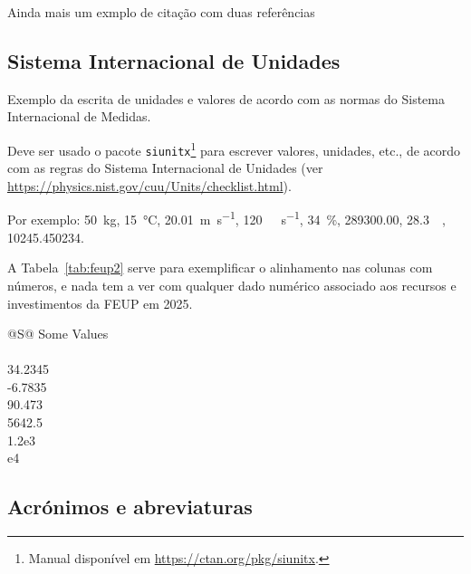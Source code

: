 Ainda mais um exmplo de citação com duas referências~\parencite{iso_19156_2011,ornelas2016} 
\lipsum[5]

\subsection*{Sistema Internacional de Unidades} \label{sec:siu}

\begin{info}
Exemplo da escrita de unidades e valores de acordo com as normas do Sistema Internacional de Medidas.
\end{info}

Deve ser usado o pacote \texttt{siunitx}\footnote{Manual disponível em 
\url{https://ctan.org/pkg/siunitx}.} para escrever valores, unidades, etc., 
de acordo com as regras do Sistema Internacional de Unidades 
(ver \url{https://physics.nist.gov/cuu/Units/checklist.html}). 

Por exemplo:
\SI{50}{\kilo\gram}, 
\SI{15}{\celsius}, 
\SI{20,01}{\meter\per\second}, 
\SI{120}{\kilo\byte\per\second}, 
\SI{34}{\percent}, 
\SI{289300.00}{\eurocurrency}, 
\SI{28.3}{\mega\eurocurrency}, 
\num{10245.450234}.

A Tabela~\ref{tab:feup2} %
serve para exemplificar o alinhamento nas colunas com números, e nada tem a ver com qualquer dado numérico associado aos recursos e investimentos da \acs*{FEUP} em 2025.

\begin{table}
  \centering
  \caption[Physical Resources of \acs*{FEUP}]{Physical Resources of \acs*{FEUP}~\parencite{kn:feup}.}
  \begin{tabular}{@{}S@{}}
    \toprule
    {Some Values} \\
     \\
    34.2345 \\
    -6.7835 \\
    90.473 \\
    5642.5 \\
    1.2e3 \\
    e4 \\
    \bottomrule
  \end{tabular}
  \label{tab:feup2}
\end{table}

\lipsum[6]

\subsection*{Acrónimos e abreviaturas} \label{sec:acronym}

